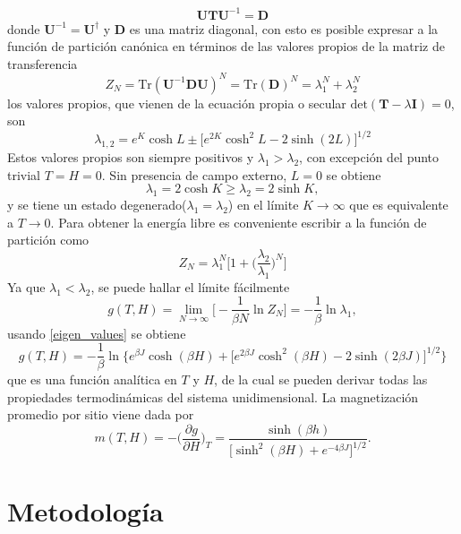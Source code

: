 \documentclass[a4paper]{article}
\begin{document}
\begin{equation*}
\mathbf{U}\mathbf{T}\mathbf{U}^{-1}=\mathbf{D}
\end{equation*}
donde $\mathbf{U}^{-1}=\mathbf{U}^\dagger$ y $\mathbf{D}$ es una matriz diagonal, con esto es posible expresar a la función de partición canónica en términos de las valores propios de la matriz de transferencia
\begin{equation}
Z_N=\text{Tr}(\mathbf{U}^{-1}\mathbf{D}\mathbf{U})^N=\text{Tr}(\mathbf{D})^N=\lambda_1^N +\lambda_2^N
\end{equation}
los valores propios, que vienen de la ecuación propia o secular $\text{det}(\mathbf{T}-\lambda \mathbf{I})=0$, son
\begin{equation}\label{eigen_values}
\lambda_{1,2}=e^K \cosh L \pm \big[ e^{2K} \cosh^2L-2\sinh(2L)\big]^{1/2}
\end{equation}
Estos valores propios son siempre positivos y $\lambda_1>\lambda_2$, con excepción del punto trivial $T=H=0$. Sin presencia de campo externo, $L=0$ se obtiene
\begin{equation}
\lambda_1=2\cosh K\geq \lambda_2=2\sinh K,
\end{equation} 
y se tiene un estado degenerado($\lambda_1=\lambda_2$) en el límite $K\to \infty$ que es equivalente a $T\to 0$. Para obtener la energía libre es conveniente escribir a la función de partición como 
\begin{equation}
Z_N=\lambda_1^N\Bigg[1+\bigg(\frac{\lambda_2}{\lambda_1}\bigg)^N\Bigg]
\end{equation}
Ya que $\lambda_1<\lambda_2$, se puede hallar el límite fácilmente
\begin{equation}
g(T,H)=\lim_{N\to \infty}\Bigg[-\frac{1}{\beta N}\ln Z_N\Bigg]=-\frac{1}{\beta}\ln \lambda_1,
\end{equation}
usando \ref{eigen_values} se obtiene
\begin{equation}
g(T,H)=-\frac{1}{\beta}\ln\Big\{ e^{\beta J}\cosh(\beta H)+\big[ e^{2\beta J} \cosh^2(\beta H)-2\sinh(2\beta J)  \big]^{1/2} \Big\}
\end{equation}
que es una función analítica en $T$ y $H$, de la cual se pueden derivar todas las propiedades termodinámicas del sistema unidimensional. La magnetización promedio por sitio viene dada por 
\begin{equation}
m(T,H)=-\bigg( \frac{\partial g}{\partial H} \bigg)_{T}=\frac{\sinh(\beta h)}{\big[ \sinh^2(\beta H)+e^{-4\beta J} \big]^{1/2}}.
\end{equation}
\section{Metodología}
\end{document}
